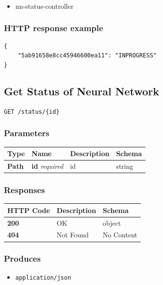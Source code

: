 \begin{itemize}
\tightlist
\item
  nn-status-controller
\end{itemize}

\subsubsection{HTTP response example}\label{http-response-example}

\begin{verbatim}
{
    "5ab91658e8cc45946600ea11": "INPROGRESS"
}
\end{verbatim}

\subsection{Get Status of Neural
Network}\label{get-status-of-neural-network}

\begin{verbatim}
GET /status/{id}
\end{verbatim}

\subsubsection{Parameters}\label{parameters-9}

\begin{longtable}[]{@{}llll@{}}
\toprule
Type & Name & Description & Schema\tabularnewline
\midrule
\endhead
\textbf{Path} & \textbf{id} \emph{required} & id & string\tabularnewline
\bottomrule
\end{longtable}

\subsubsection{Responses}\label{responses-11}

\begin{longtable}[]{@{}lll@{}}
\toprule
HTTP Code & Description & Schema\tabularnewline
\midrule
\endhead
\textbf{200} & OK & object\tabularnewline
\textbf{404} & Not Found & No Content\tabularnewline
\bottomrule
\end{longtable}

\subsubsection{Produces}\label{produces-11}

\begin{itemize}
\tightlist
\item
  \texttt{application/json}
\end{itemize}

